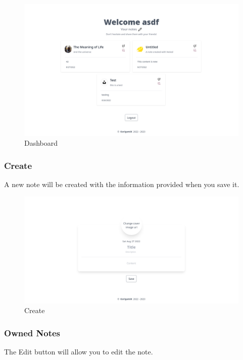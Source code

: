 \documentclass[
]{article}
\begin{document}
\begin{figure}[!h]
  \centering
  \includegraphics{../.github/images/dashboard.png}
  \caption{Dashboard}
\end{figure}

\hypertarget{create}{%
  \subsubsection{Create}\label{create}
  A new note will be created with the information provided when you save it.
}

\begin{figure}[!h]
  \centering
  \includegraphics{../.github/images/create.png}
  \caption{Create}
\end{figure}

\hypertarget{owned-notes}{%
  \pagebreak
  \subsubsection{Owned Notes}\label{owned-notes}
  The Edit button will allow you to edit the note.
}
\end{document}
